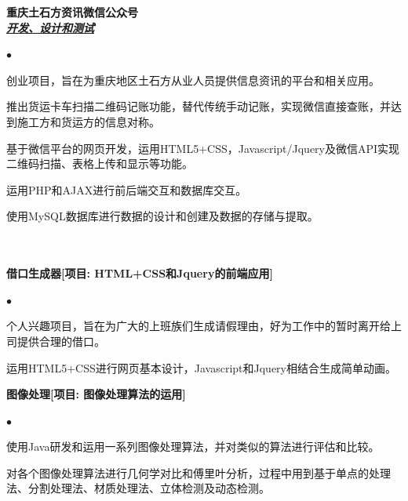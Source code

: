 \documentclass[UTF8]{ctexart}
\newcommand{\lineunder}{\vspace*{-8pt} \\
\hspace*{-18pt} \hrulefill \\}
\newcommand{\header}[1]{\large \vspace*{12pt}{\Large \hspace*{-15pt}\vspace*{6pt} \textsc{#1}} \vspace*{-6pt} \lineunder}
\newcommand{\seconder}[1]{\vspace*{12pt}{\Large \hspace*{-15pt}\vspace*{6pt} \textsc{#1}} \vspace*{-6pt} \lineunder}
\newcommand{\website}[3]{{\normalsize \textbf{#1}\\
\underline{\textbf{\emph{#3}}}\\
}}
\newcommand{\courses}[1]{\vspace*{12pt}\normalsize \textbf{#1}\\
}    %
\newenvironment{achievements}{
\begin{list}
        {$\bullet$}{\topsep 0pt
        \itemsep 0pt}}{\vspace*{4pt}
\end{list}
}
\newenvironment{courseworks}{
\begin{list}
        {$\bullet$}{\topsep 0pt
        \itemsep -2pt}}{\vspace*{4pt}
\end{list}
}
\begin{document}
\newpage
\vspace*{-20pt}

\website{\textbf{重庆土石方资讯微信公众号}}{}{开发、设计和测试}
\begin{achievements}
    \item 创业项目，旨在为重庆地区土石方从业人员提供信息资讯的平台和相关应用。
    \item 推出货运卡车扫描二维码记账功能，替代传统手动记账，实现微信直接查账，并达到施工方和货运方的信息对称。
    \item 基于微信平台的网页开发，运用HTML5+CSS，Javascript/Jquery及微信API实现二维码扫描、表格上传和显示等功能。
    \item 运用PHP和AJAX进行前后端交互和数据库交互。
    \item 使用MySQL数据库进行数据的设计和创建及数据的存储与提取。
\end{achievements}


\seconder{其他项目}

\courses{借口生成器[项目: HTML+CSS和Jquery的前端应用]}
\begin{courseworks}
    \item	个人兴趣项目，旨在为广大的上班族们生成请假理由，好为工作中的暂时离开给上司提供合理的借口。
    \item	运用HTML5+CSS进行网页基本设计，Javascript和Jquery相结合生成简单动画。
\end{courseworks}

\courses{图像处理[项目: 图像处理算法的运用]}
\begin{courseworks}
    \item	使用Java研发和运用一系列图像处理算法，并对类似的算法进行评估和比较。
    \item	对各个图像处理算法进行几何学对比和傅里叶分析，过程中用到基于单点的处理法、分割处理法、材质处理法、立体检测及动态检测。
\end{courseworks}
\end{document}
